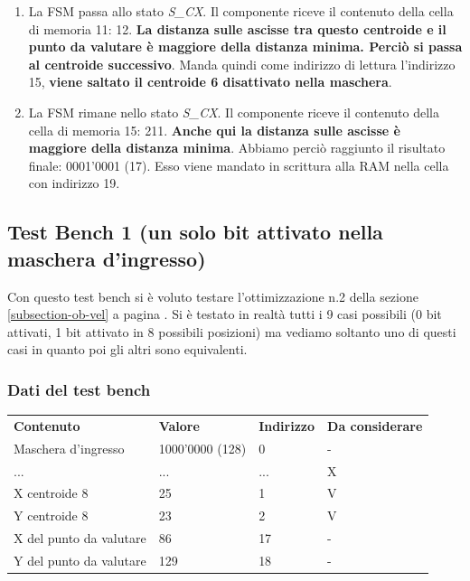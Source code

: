 \documentclass{article}
\begin{document}
\begin{enumerate}
    \item La FSM passa allo stato \textit{S\_CX}. Il componente riceve il contenuto della cella di memoria 11: 12. \textbf{La distanza sulle ascisse tra questo centroide e il punto da valutare è maggiore della distanza minima. Perciò si passa al centroide successivo}. Manda quindi come indirizzo di lettura l'indirizzo 15, \textbf{viene saltato il centroide 6 disattivato nella maschera}.
    \item La FSM rimane nello stato \textit{S\_CX}. Il componente riceve il contenuto della cella di memoria 15: 211. \textbf{Anche qui la distanza sulle ascisse è maggiore della distanza minima}. Abbiamo perciò raggiunto il risultato finale: 0001'0001 (17). Esso viene mandato in scrittura alla RAM nella cella con indirizzo 19.
\end{enumerate}

\subsection{Test Bench 1 (un solo bit attivato nella maschera d'ingresso)}
Con questo test bench si è voluto testare l'ottimizzazione n.2 della sezione \ref{subsection-ob-vel} a pagina \pageref{subsection-ob-vel}. Si è testato in realtà tutti i 9 casi possibili (0 bit attivati, 1 bit attivato in 8 possibili posizioni) ma vediamo soltanto uno di questi casi in quanto poi gli altri sono equivalenti.

\subsubsection{Dati del test bench}
\begin{table}[H]
    \begin{tabu} to 0.8\textwidth { X[1.7l] X[1.1c] X[0.7c] X[1.1c]}
        \textbf{Contenuto} & \textbf{Valore} & \textbf{Indirizzo} & \textbf{Da considerare} \\
        Maschera d'ingresso & 1000'0000 (128) & 0 & - \\
        ... & ... & ... & X \\
        X centroide 8 & 25 & 1 & V \\
        Y centroide 8 & 23 & 2 & V \\
        X del punto da valutare & 86 & 17 & - \\
        Y del punto da valutare & 129 & 18 & - \\
    \end{tabu}
\end{table}
\end{document}
